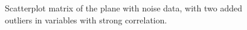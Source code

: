 \documentclass[
  letterpaper,
]{krantz}
\begin{document}
\begin{figure}[H]


\caption{\label{fig-plane-noise-outlier}Scatterplot matrix of the plane
with noise data, with two added outliers in variables with strong
correlation.}

\end{figure}%
\end{document}

